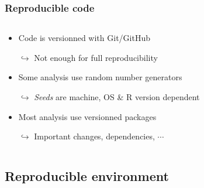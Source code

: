 \documentclass[xcolor=x11names,compress]{beamer}
\renewcommand{\(}{\begin{columns}}
\renewcommand{\)}{\end{columns}}
\newcommand{\<}[1]{\begin{column}{#1}}
\renewcommand{\>}{\end{column}}
\begin{document}
\begin{frame}
\frametitle{Reproducible code}
\begin{columns}[t]
 \begin{column}{0.8\textwidth}
 \begin{itemize}[<+->]
        \item Code is versionned with Git/GitHub
        \item[$\hookrightarrow$] Not enough for full reproducibility
        \item Some analysis use random number generators
        \item[$\hookrightarrow$] \emph{Seeds} are machine, OS \& R version dependent \\
        \item Most analysis use versionned packages
        \item[$\hookrightarrow$] Important changes, dependencies, $\cdots$ 
    \end{itemize}
 \end{column}
  \begin{column}{0.2\textwidth}
    \begin{center}
    \begin{itemize}
    \end{itemize}
    \end{center}
  \end{column}
\end{columns}
\end{frame}


\subsection{Reproducible environment}
\end{document}
